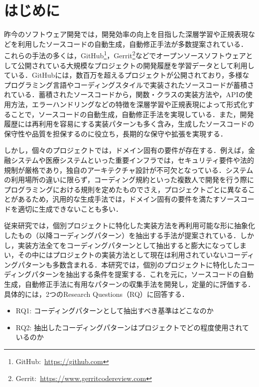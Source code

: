 \documentclass[11pt]{jreport}
\newcommand{\RQone}{コーディングパターンとして抽出すべき基準はどこなのか}
\newcommand{\RQtwo}{抽出したコーディングパターンはプロジェクトでどの程度使用されているのか}
\begin{document}
\chapter{はじめに}
昨今のソフトウェア開発では，開発効率の向上を目指した深層学習や正規表現などを利用したソースコードの自動生成，自動修正手法が多数提案されている\cite{deep_learnnig1}\cite{deep_learning2}\cite{deep_learnnig3}\cite{deep_learnning4}．
これらの手法の多くは，GitHub\footnote{GitHub:~\url{https://github.com}}，Gerrit\footnote{Gerrit:~\url{https://www.gerritcodereview.com}}などでオープンソースソフトウェアとして公開されている大規模なプロジェクトの開発履歴を学習データとして利用している．GitHubには，数百万を超えるプロジェクトが公開されており，多様なプログラミング言語やコーディングスタイルで実装されたソースコードが蓄積されている．蓄積されたソースコードから，関数・クラスの実装方法や，APIの使用方法，エラーハンドリングなどの特徴を深層学習や正規表現によって形式化することで，ソースコードの自動生成，自動修正手法を実現している．また，開発履歴には再利用を容易にする実装パターンも多く含み，生成したソースコードの保守性や品質を担保するのに役立ち，長期的な保守や拡張を実現する．

しかし，個々のプロジェクトでは，ドメイン固有の要件が存在する．例えば，金融システムや医療システムといった重要インフラでは，セキュリティ要件や法的規制が厳格であり，独自のアーキテクチャ設計が不可欠となっている\cite{finacial}\cite{financial2}\cite{medical}．システムの利用場所の違いに限らず，コーディング規約といった複数人で開発を行う際にプログラミングにおける規則を定めたものでさえ，プロジェクトごとに異なることがあるため，汎用的な生成手法では，ドメイン固有の要件を満たすソースコードを適切に生成できないことも多い．

従来研究では，個別プロジェクトに特化した実装方法を再利用可能な形に抽象化したもの（以降コーディングパターン）を抽出する手法が提案されている\cite{devreplay}．しかし，実装方法全てをコーディングパターンとして抽出すると膨大になってしまい，その中にはプロジェクトの実装方法として現在は利用されていないコーディングパターンも多数含まれる．本研究では，個別のプロジェクトに特化したコーディングパターンを抽出する条件を提案する．これを元に，ソースコードの自動生成，自動修正手法に有用なパターンの収集手法を開発し，定量的に評価する．具体的には，2つのResearch Questions（RQ）に回答する．
\begin{itemize}
    \item RQ1: \RQone
    \item RQ2: \RQtwo
\end{itemize}
\end{document}
